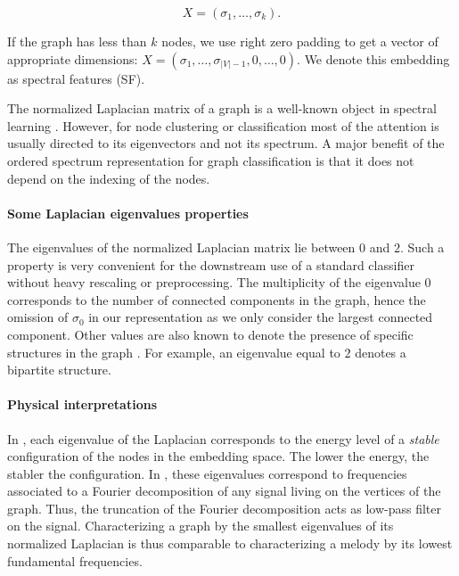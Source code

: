 \documentclass{article}
\begin{document}
\begin{equation*}
    X = (\sigma_1, \dots, \sigma_k).
\end{equation*}

If the graph has less than $k$ nodes, we use right zero padding to get a vector of appropriate dimensions: $X = (\sigma_1, \dots, \sigma_{|V|-1}, 0, \dots, 0)$. We denote this embedding as spectral features (SF).

The normalized Laplacian matrix of a graph is a well-known object in spectral learning \citep{belkin2002laplacian, kamvar2003spectral}. However, for node clustering or classification most of the attention is usually directed to its eigenvectors and not its spectrum. A major benefit of the ordered spectrum representation for graph classification is that it does not depend on the indexing of the nodes. 



\paragraph{Some Laplacian eigenvalues properties}
The eigenvalues of the normalized Laplacian matrix lie between $0$ and $2$. Such a property is very convenient for the downstream use of a standard classifier without heavy rescaling or preprocessing. The multiplicity of the eigenvalue $0$ corresponds to the number of connected components in the graph, hence the omission of $\sigma_0$ in our representation as we only consider the largest connected component. Other values are also known to denote the presence of specific structures in the graph \citep{chung1997spectral}. For example, an eigenvalue equal to $2$ denotes a bipartite structure.


\paragraph{Physical interpretations} In \citep{bonald2018weighted}, each eigenvalue of the Laplacian corresponds to the energy level of a \textit{stable} configuration of the nodes in the embedding space. The lower the energy, the stabler the configuration. In \citep{shuman2016vertex}, these eigenvalues correspond to frequencies associated to a Fourier decomposition of any signal living on the vertices of the graph. Thus, the truncation of the Fourier decomposition acts as low-pass filter on the signal. Characterizing a graph by the smallest eigenvalues of its normalized Laplacian is thus comparable to characterizing a melody by its lowest fundamental frequencies.
\end{document}
